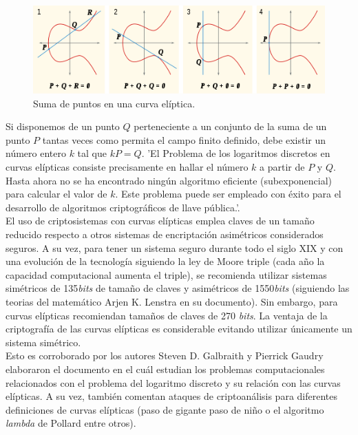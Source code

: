 \documentclass[../PFC.tex]{subfiles}
\begin{document}
\begin{figure}[H]
  \centering
  \includegraphics[width=1\textwidth]{./img/ECC}
  \caption{Suma de puntos en una curva elíptica.}
  \label{img:ecc}
\end{figure}

Si disponemos de un punto $Q$ perteneciente a un conjunto de la suma de un punto $P$ tantas veces como permita el campo finito definido, debe existir un número entero $k$ tal que $kP = Q$. 'El Problema de los logaritmos discretos en curvas elípticas consiste precisamente en hallar el número $k$ a partir de $P$ y $Q$. Hasta ahora no se ha encontrado ningún algoritmo eficiente (subexponencial) para calcular el valor de $k$. Este problema puede ser empleado con éxito para el desarrollo de algoritmos criptográficos de llave pública.'\cite{lucena}.
\*
\vspace{0.5515cm}
\\
El uso de criptosistemas con curvas elípticas emplea claves de un tamaño reducido respecto a otros sistemas de encriptación asimétricos considerados seguros. A su vez, para tener un sistema seguro durante todo el siglo XIX y con una evolución de la tecnología siguiendo la ley de Moore triple (cada año la capacidad computacional aumenta el triple), se recomienda utilizar sistemas simétricos de 135\textit{bits} de tamaño de claves y asimétricos de 1550\textit{bits} (siguiendo las teorias del matemático Arjen K. Lenstra en su documento\cite{lenstra}). Sin embargo, para curvas elípticas recomiendan tamaños de claves de 270 \textit{bits}. La ventaja de la criptografía de las curvas elípticas es considerable evitando utilizar únicamente un sistema simétrico\cite{keylength}.
\*
\vspace{0.5515cm}
\\
Esto es corroborado por los autores Steven D. Galbraith y Pierrick Gaudry elaboraron el documento \cite{galbraith2016recent} en el cuál estudian los problemas computacionales relacionados con el problema del logaritmo discreto y su relación con las curvas elípticas. A su vez, también comentan ataques de criptoanálisis para diferentes definiciones de curvas elípticas (paso de gigante paso de niño o el algoritmo \textit{lambda} de Pollard entre otros).
\pagebreak
\end{document}

